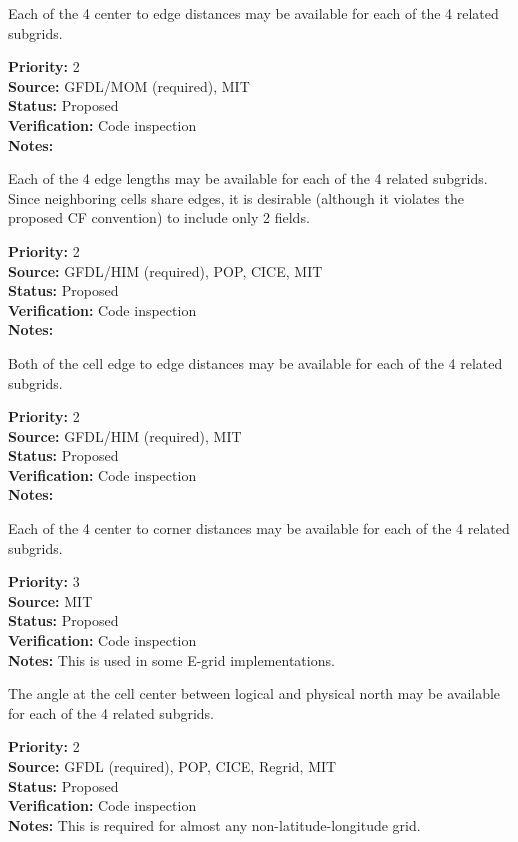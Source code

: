 Each of the 4 center to edge distances may be available for each of the 4 related
subgrids.
\begin{reqlist}
{\bf Priority:} 2 \\
{\bf Source:} GFDL/MOM (required), MIT \\
{\bf Status:} Proposed \\
{\bf Verification:} Code inspection \\
{\bf Notes:} 
\end{reqlist}

Each of the 4 edge lengths may be available for each of the 4 related
subgrids.  Since neighboring cells share edges, it is desirable (although it violates
the proposed CF convention) to include only 2 fields.
\begin{reqlist}
{\bf Priority:} 2 \\
{\bf Source:} GFDL/HIM (required), POP, CICE, MIT \\
{\bf Status:} Proposed \\
{\bf Verification:} Code inspection \\
{\bf Notes:} 
\end{reqlist}

Both of the cell edge to edge distances may be available for each of the 4 related
subgrids.
\begin{reqlist}
{\bf Priority:} 2 \\
{\bf Source:} GFDL/HIM (required), MIT \\
{\bf Status:} Proposed \\
{\bf Verification:} Code inspection \\
{\bf Notes:} 
\end{reqlist}

Each of the 4 center to corner distances may be available for each of the 4
related subgrids.
\begin{reqlist}
{\bf Priority:} 3 \\
{\bf Source:} MIT \\
{\bf Status:} Proposed \\
{\bf Verification:} Code inspection \\
{\bf Notes:} This is used in some E-grid implementations.
\end{reqlist}

The angle at the cell center between logical and physical north may be available
for each of the 4 related subgrids.
\begin{reqlist}
{\bf Priority:} 2 \\
{\bf Source:} GFDL (required), POP, CICE, Regrid, MIT \\
{\bf Status:} Proposed \\
{\bf Verification:} Code inspection \\
{\bf Notes:} This is required for almost any non-latitude-longitude grid.
\end{reqlist}

